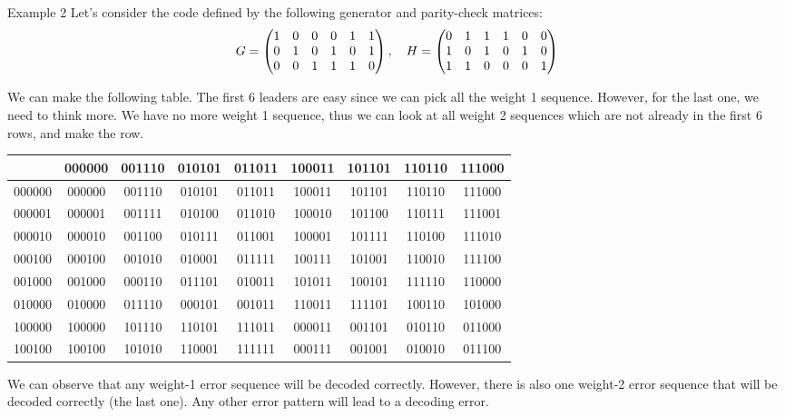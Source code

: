 \documentclass[a4paper]{article}
\begin{document}
\begin{parag}{Example 2}
    Let's consider the code defined by the following generator and parity-check matrices: 
    \[G = \begin{pmatrix} 1 & 0 & 0 & 0 & 1 & 1 \\ 0 & 1 & 0 & 1 & 0 & 1 \\ 0 & 0 & 1 & 1 & 1 & 0 \end{pmatrix}, \quad H = \begin{pmatrix} 0 & 1 & 1 & 1 & 0 & 0 \\ 1 & 0 & 1 & 0 & 1 & 0 \\ 1 & 1 & 0 & 0 & 0 & 1 \end{pmatrix} \]
    
    We can make the following table. The first 6 leaders are easy since we can pick all the weight 1 sequence. However, for the last one, we need to think more. We have no more weight 1 sequence, thus we can look at all weight 2 sequences which are not already in the first 6 rows, and make the  row.
    \begin{center}
    \begin{tabular}{c|cccccccc}
        & 000000 & 001110 & 010101 & 011011 & 100011 & 101101 & 110110 & 111000 \\
        \hline
        000000 & 000000 & 001110 & 010101 & 011011 & 100011 & 101101 & 110110 & 111000 \\ 
        000001 & 000001 & 001111 & 010100 & 011010 & 100010 & 101100 & 110111 & 111001 \\
        000010 & 000010 & 001100 & 010111 & 011001 & 100001 & 101111 & 110100 & 111010 \\
        000100 & 000100 & 001010 & 010001 & 011111 & 100111 & 101001 & 110010 & 111100 \\
        001000 & 001000 & 000110 & 011101 & 010011 & 101011 & 100101 & 111110 & 110000 \\
        010000 & 010000 & 011110 & 000101 & 001011 & 110011 & 111101 & 100110 & 101000 \\
        100000 & 100000 & 101110 & 110101 & 111011 & 000011 & 001101 & 010110 & 011000 \\
        100100 & 100100 & 101010 & 110001 & 111111 & 000111 & 001001 & 010010 & 011100 \\
    \end{tabular}
    \end{center}

    We can observe that any weight-1 error sequence will be decoded correctly. However, there is also one weight-2 error sequence that will be decoded correctly (the last one). Any other error pattern will lead to a decoding error.


\end{parag}
\end{document}

